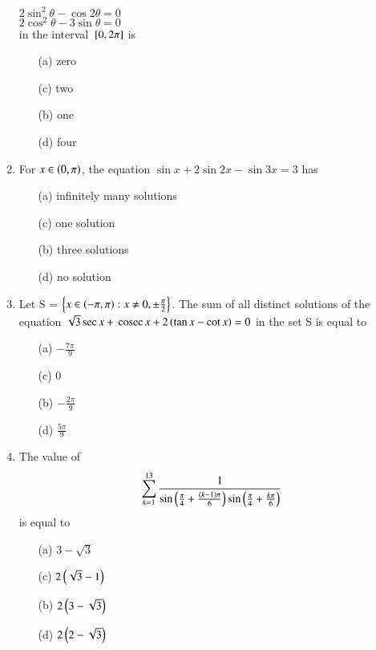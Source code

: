 \documentclass[journal,12pt,twocolumn,article]{IEEEtran}
\theoremstyle{remark}
\begin{document}
\begin{enumerate}[start = 20]
$2\sin^2\theta - \cos2\theta = 0$\\
$2\cos^2\theta - 3\sin\theta = 0$\\
in the interval ${}\left[0,2\pi\right]$ is
\hfill{}
\begin{multicols}{2}
\begin{enumerate}
\item[(a)] zero
\item[(c)] two
\columnbreak
\item[(b)] one
\item[(d)] four
\end{enumerate}
\end{multicols}
\item For $x \in \left(0,\pi\right)$, the equation $\sin x + 2\sin 2x - \sin 3x = 3$ has
\hfill{}
\begin{multicols}{2}
\begin{enumerate}
\item[(a)] infinitely many solutions
\item[(c)] one solution
\columnbreak
\item[(b)] three solutions
\item[(d)] no solution
\end{enumerate}
\end{multicols}
\item Let S = $\left\{x \in \left(-\pi,\pi\right) : x \neq 0, \pm \frac{\pi}{2}\right\}$. The sum of all distinct solutions of the equation $\sqrt{3} \sec x + \,\text{cosec}\, x + 2\left(\tan x - \cot x\right) = 0$ in the set S is equal to
\hfill{}
\begin{multicols}{2}
\begin{enumerate}
\item[(a)] $-\frac{7\pi}{9}$
\item[(c)] 0
\columnbreak
\item[(b)] $-\frac{2\pi}{9}$
\item[(d)] $\frac{5\pi}{9}$
\end{enumerate}
\end{multicols}
\item The value of 
\begin{align*}
\sum_{k=1}^{13} \frac{1}{\sin\left(\frac{\pi}{4} + \frac{\left(k-1\right)\pi}{6}\right)\sin\left(\frac{\pi}{4} + \frac{k\pi}{6}\right)}
\end{align*}
is equal to
\hfill{}
\begin{multicols}{2}
\begin{enumerate}
\item[(a)] $3-\sqrt{3}$
\item[(c)] $2\left(\sqrt{3}-1\right)$
\columnbreak
\item[(b)] $2\left(3-\sqrt{3}\right)$
\item[(d)] $2\left(2-\sqrt{3}\right)$
\end{enumerate}
\end{multicols}
\end{enumerate}
\end{document}
